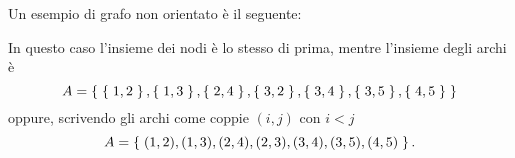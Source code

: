 Un esempio di grafo non orientato è il seguente:

In questo caso l'insieme dei nodi è lo stesso di prima, mentre l'insieme degli archi è \[
    A = \left\{\;\left\{\;1, 2\;\right\}, \left\{\;1, 3\;\right\}, \left\{\;2, 4\;\right\}, \left\{\;3, 2\;\right\}, \left\{\;3, 4\;\right\}, \left\{\;3, 5\;\right\}, \left\{\;4, 5\;\right\}\;\right\}    
\] oppure, scrivendo gli archi come coppie $(i, j)$ con $i < j$ \[
    A = \left\{\;(1, 2), (1, 3), (2, 4), (2, 3), (3, 4), (3, 5), (4, 5)\;\right\}.  
\]
